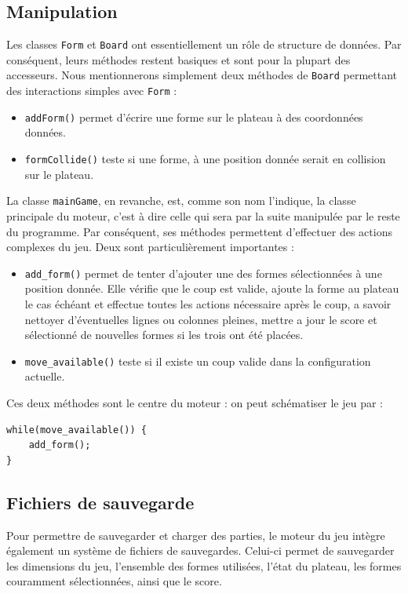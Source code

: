 \documentclass[11pt,a4paper]{article}
\begin{document}
\subsection{Manipulation}
Les classes \verb"Form" et \verb"Board" ont essentiellement un rôle de structure de données. Par conséquent, leurs méthodes restent basiques et sont pour la plupart des accesseurs. Nous mentionnerons simplement deux méthodes de \verb"Board" permettant des interactions simples avec \verb"Form" : 
\begin{itemize}
\item \verb"addForm()" permet d'écrire une forme sur le plateau à des coordonnées données.
\item \verb"formCollide()" teste si une forme, à une position donnée serait en collision sur le plateau.
\end{itemize}

La classe \verb"mainGame", en revanche, est, comme son nom l'indique, la classe principale du moteur, c'est à dire celle qui sera par la suite manipulée par le reste du programme. Par conséquent, ses méthodes permettent d'effectuer des actions complexes du jeu. Deux sont particulièrement importantes :
\begin{itemize}
\item \verb"add_form()" permet de tenter d'ajouter une des formes sélectionnées à une position donnée. Elle vérifie que le coup est valide, ajoute la forme au plateau le cas échéant et effectue toutes les actions nécessaire après le coup, a savoir nettoyer d'éventuelles lignes ou colonnes pleines, mettre a jour le score et sélectionné de nouvelles formes si les trois ont été placées.
\item \verb"move_available()" teste si il existe un coup valide dans la configuration actuelle.
\end{itemize}

Ces deux méthodes sont le centre du moteur : on peut schématiser le jeu par :
\begin{verbatim}
while(move_available()) {
    add_form();
}
\end{verbatim}

\subsection{Fichiers de sauvegarde}
Pour permettre de sauvegarder et charger des parties, le moteur du jeu intègre également un système de fichiers de sauvegardes. Celui-ci permet de sauvegarder les dimensions du jeu, l'ensemble des formes utilisées, l'état du plateau, les formes couramment sélectionnées, ainsi que le score.
\end{document}
